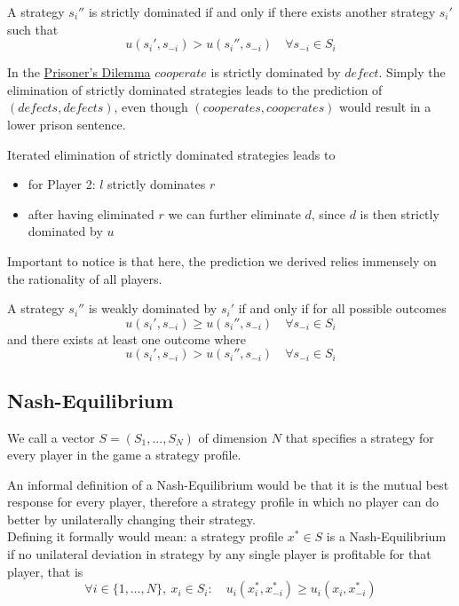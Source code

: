 \begin{definition} 
	A strategy $s_{i}''$ is strictly dominated if and only if there exists another strategy $s_{i}'$ such that
	\[ u(s_{i}', s_{-i}) > u(s_{i}'', s_{-i}) \quad \forall s_{-i} \in S_{i} \]	
\end{definition}

In the \hyperref[prisonersdilemma]{Prisoner's Dilemma} $cooperate$ is strictly dominated by $defect$. Simply the elimination of strictly dominated strategies leads to the prediction of $(defects, defects)$, even though $(cooperates, cooperates)$ would result in a lower prison sentence.


\begin{example}
	Iterated elimination of strictly dominated strategies leads to
	\begin{itemize}
		\item for Player 2: $l$ strictly dominates $r$
		\item after having eliminated $r$ we can further eliminate $d$, since $d$ is then strictly dominated by $u$
	\end{itemize}
\end{example}

Important to notice is that here, the prediction we derived relies immensely on the rationality of all players.

\begin{definition} 
	A strategy $s_{i}''$ is weakly dominated by $s_{i}'$ if and only if for all possible outcomes 
	\[ u(s_{i}', s_{-i}) \geq u(s_{i}'', s_{-i}) \quad \forall s_{-i} \in S_{i} \]	
	and there exists at least one outcome where
		\[ u(s_{i}', s_{-i}) > u(s_{i}'', s_{-i}) \quad \forall s_{-i} \in S_{i} \]	 
\end{definition}

\subsection{Nash-Equilibrium}

\begin{definition} \label{strategyprofile} 
	We call a vector $S = (S_{1}, \dotsc, S_{N})$ of dimension $N$ that specifies a strategy for every player in the game a strategy profile.
\end{definition}

\begin{definition} \label{nashequilibrium} 
	An informal definition of a Nash-Equilibrium would be that it is the mutual best response for every player, therefore a strategy profile in which no player can do better by unilaterally changing their strategy. \\
	Defining it formally would mean: a strategy profile $x^{*} \in S$ is a Nash-Equilibrium if no unilateral deviation in strategy by any single player is profitable for that player, that is
	\[ \forall i \in \{1, \dotsc, N \},~ x_{i} \in S_{i} : \quad u_{i}(x_{i}^{*}, x_{-i}^{*}) \geq u_{i}(x_{i}, x_{-i}^{*}) \]
	\end{definition}

